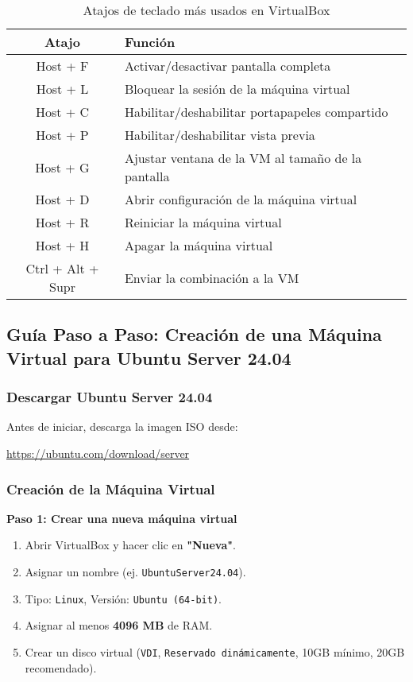 \documentclass{article}
\begin{document}
\begin{table}[h]
    \centering
    \begin{tabular}{|c|l|}
        \hline
        \textbf{Atajo} & \textbf{Función} \\
        \hline
        Host + F & Activar/desactivar pantalla completa \\
        Host + L & Bloquear la sesión de la máquina virtual \\
        Host + C & Habilitar/deshabilitar portapapeles compartido \\
        Host + P & Habilitar/deshabilitar vista previa \\
        Host + G & Ajustar ventana de la VM al tamaño de la pantalla \\
        Host + D & Abrir configuración de la máquina virtual \\
        Host + R & Reiniciar la máquina virtual \\
        Host + H & Apagar la máquina virtual \\
        Ctrl + Alt + Supr & Enviar la combinación a la VM \\
        \hline
    \end{tabular}
    \caption{Atajos de teclado más usados en VirtualBox}
    \label{tab:atajos}
\end{table}

\subsection{Guía Paso a Paso: Creación de una Máquina Virtual para Ubuntu Server 24.04}

\subsubsection{Descargar Ubuntu Server 24.04}
Antes de iniciar, descarga la imagen ISO desde:

\begin{center}
    \url{https://ubuntu.com/download/server}
\end{center}

\subsubsection{Creación de la Máquina Virtual}

\textbf{Paso 1: Crear una nueva máquina virtual}
\begin{enumerate}
    \item Abrir VirtualBox y hacer clic en \textbf{"Nueva"}.
    \item Asignar un nombre (ej. \texttt{UbuntuServer24.04}).
    \item Tipo: \texttt{Linux}, Versión: \texttt{Ubuntu (64-bit)}.
    \item Asignar al menos \textbf{4096 MB} de RAM.
    \item Crear un disco virtual (\texttt{VDI}, \texttt{Reservado dinámicamente}, 10GB mínimo, 20GB recomendado).
\end{enumerate}
\end{document}
